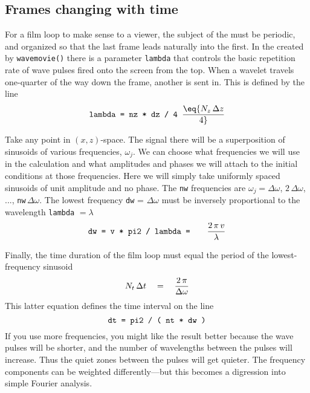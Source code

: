 \subsection{Frames changing with time}
\par
For a film loop to make sense to a viewer,
the subject of the  must be periodic,
and organized so that the last frame leads naturally into the first.
In the  created by {\tt wavemovie()}
there is a parameter
{\tt lambda}
that controls the basic repetition rate of wave pulses fired
onto the screen from the top.
When a wavelet travels one-quarter of the way down the frame,
another is sent in.
This is defined by the line
$$
\hbox{\tt lambda  =  nz * dz / 4 } \eq  {N_z \, \Delta z   \over 4 }
$$
\par
Take any point in $(x,z)$-space.
The signal there will be a superposition of sinusoids
of various frequencies, $\omega_j$.
We can choose what frequencies
we will use in the calculation
and what amplitudes and phases we will attach to the initial conditions
at those frequencies.
Here we will simply take uniformly spaced sinusoids of unit amplitude
and no phase.
The {\tt nw}  frequencies are
$\omega_j = \Delta \omega$,
$2\,\Delta \omega$,
...,
{\tt nw}$\,\Delta \omega$.
The lowest frequency  {\tt dw} = $\Delta \omega$
must be inversely proportional to the wavelength
{\tt lambda} $= \lambda$
$$
\hbox{\tt dw = v * pi2 / lambda =} \quad \quad
{ 2 \, \pi \, v   \over \lambda }
$$
\par
Finally, the time duration of the film loop must
equal the period of the lowest-frequency sinusoid
$$
N_t \, \Delta t \ \ \  = \ \ \  { 2 \, \pi   \over  \Delta \omega }
$$
This latter equation defines the time interval on the line
$$
\hbox{\tt dt   =   pi2 / ( nt * dw )}
$$
If you use more frequencies,
you might like the result better
because the wave pulses will be shorter,
and the number of wavelengths between the pulses will increase.
Thus the quiet zones between the pulses will get quieter.
The frequency components can be weighted differently---but
this becomes a digression into simple Fourier analysis.
